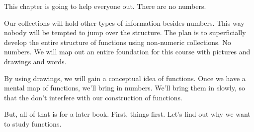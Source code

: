 \documentclass{ximera}
\begin{document}
This chapter is going to help everyone out.  There are no numbers.  

Our collections will hold other types of information besides numbers. This way nobody will be tempted to jump over the structure. 
 The plan is to superficially develop the entire structure of functions using non-numeric collections. No numbers. We will map out an entire foundation for this course with pictures and drawings and words. 

By using drawings, we will gain a conceptual idea of functions.  Once we have a mental map of functions, we'll bring in numbers. We'll bring them in slowly, so that the don't interfere with our construction of functions.

But, all of that is for a later book.  First, things first.  Let's find out why we want to study functions.
\end{document}
